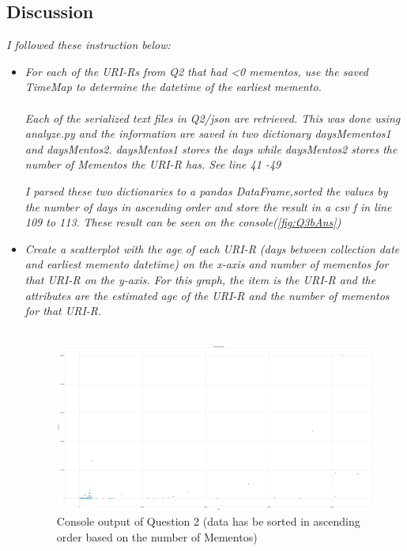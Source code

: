 \documentclass[12pt]{article}
\begin{document}
\subsection*{Discussion}
\emph{I followed these instruction below:}
\begin{itemize}
    \item \emph{For each of the URI-Rs from Q2 that had \textless  0 mementos, use the saved TimeMap to determine the datetime of the earliest memento.}
    \emph{\\ \\Each of the serialized text files in Q2\slash json are retrieved. This was done using analyze.py and the information are saved in two dictionary daysMementos1 and daysMentos2. daysMentos1 stores the days while daysMentos2 stores the number of Mementos the URI-R has. See line 41 -49}
        
        \emph{I parsed these two dictionaries to a pandas DataFrame,sorted the values by the number of days in ascending order and store the result in a csv f
         in line 109 to 113. } 
        \emph{These result can be seen on the console(\ref{fig:Q3bAns})}
        
    \item \emph{Create a scatterplot with the age of each URI-R (days between collection date and earliest memento datetime) on the x-axis and number of mementos for that URI-R on the y-axis. For this graph, the item is the URI-R and the attributes are the estimated age of the URI-R and the number of mementos for that URI-R.}
        \emph{\\  \\ \color{blue}{Answer}}

        \begin{figure}[H]
            \centering
            \includegraphics[trim=0 0 0 0, clip, width=\textwidth] {scatterplot.PNG}
            \caption{Console output of Question 2 (data has be sorted in ascending order based on the number of Mementos)}
            \label{fig:32Ans}
        \end{figure}  


\end{itemize}
\end{document}
